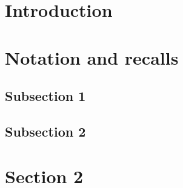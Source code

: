 \documentclass[a4paper,twoside]{article}
\begin{document}
\makeRR   %

  
\tableofcontents 
\newpage

\section{Introduction}


\section{Notation and recalls}
\label{sec-rec}


\subsection{Subsection 1}

\subsection{Subsection 2}

\section{Section 2}


	\newpage
\end{document}
